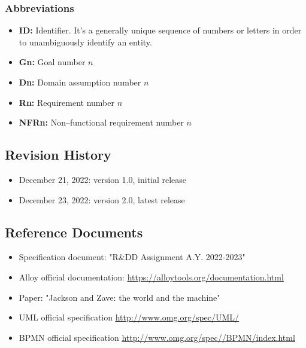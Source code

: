 \subsubsection{Abbreviations}
\begin{itemize}
        \item \textbf{ID:} Identifier. It's a generally unique sequence of numbers or letters in order to unambiguously identify an entity.
        \item \textbf{Gn:} Goal number $n$
        \item \textbf{Dn:} Domain assumption number $n$
        \item \textbf{Rn:} Requirement number $n$
        \item \textbf{NFRn:} Non--functional requirement number $n$
\end{itemize}
\subsection{Revision History}
\begin{itemize}
        \item December 21, 2022: version 1.0, initial release
        \item December 23, 2022: version 2.0, latest release
    \end{itemize}
\subsection{Reference Documents}
\begin{itemize}
        \item Specification document: "R\&DD Assignment A.Y. 2022-2023"
        \item Alloy official documentation: \underline{\url{https://alloytools.org/documentation.html}}
        \item Paper: "Jackson and Zave: the world and the machine"
        \item UML official specification \underline{\url{http://www.omg.org/spec/UML/}}
        \item BPMN official specification \underline{\url{http://www.omg.org/spec//BPMN/index.html}}
\end{itemize}
